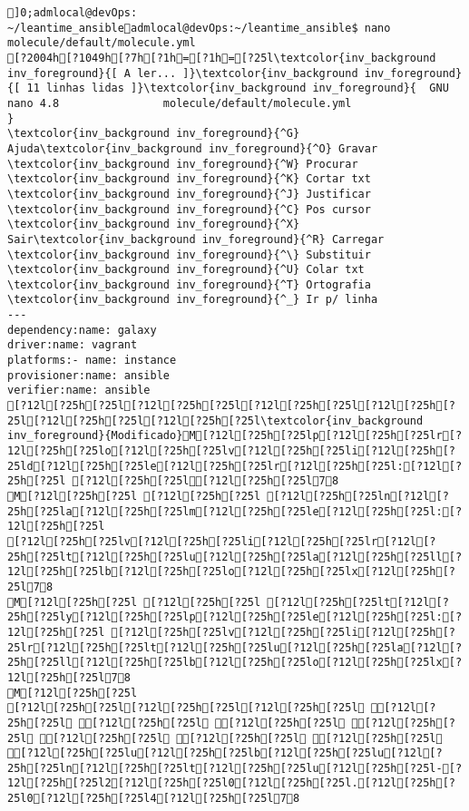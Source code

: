 \documentclass{scrartcl}
\title{}
\begin{document}
\begin{Verbatim}
]0;admlocal@devOps: ~/leantime_ansibleadmlocal@devOps:~/leantime_ansible$ nano molecule/default/molecule.yml 
[?2004h[?1049h[?7h[?1h=[?1h=[?25l\textcolor{inv_background inv_foreground}{[ A ler... ]}\textcolor{inv_background inv_foreground}{[ 11 linhas lidas ]}\textcolor{inv_background inv_foreground}{  GNU nano 4.8                molecule/default/molecule.yml                            }
\textcolor{inv_background inv_foreground}{^G} Ajuda\textcolor{inv_background inv_foreground}{^O} Gravar     \textcolor{inv_background inv_foreground}{^W} Procurar   \textcolor{inv_background inv_foreground}{^K} Cortar txt \textcolor{inv_background inv_foreground}{^J} Justificar \textcolor{inv_background inv_foreground}{^C} Pos cursor
\textcolor{inv_background inv_foreground}{^X} Sair\textcolor{inv_background inv_foreground}{^R} Carregar   \textcolor{inv_background inv_foreground}{^\} Substituir \textcolor{inv_background inv_foreground}{^U} Colar txt  \textcolor{inv_background inv_foreground}{^T} Ortografia \textcolor{inv_background inv_foreground}{^_} Ir p/ linha
---
dependency:name: galaxy
driver:name: vagrant
platforms:- name: instance
provisioner:name: ansible
verifier:name: ansible
[?12l[?25h[?25l[?12l[?25h[?25l[?12l[?25h[?25l[?12l[?25h[?25l[?12l[?25h[?25l[?12l[?25h[?25l\textcolor{inv_background inv_foreground}{Modificado}M[?12l[?25h[?25lp[?12l[?25h[?25lr[?12l[?25h[?25lo[?12l[?25h[?25lv[?12l[?25h[?25li[?12l[?25h[?25ld[?12l[?25h[?25le[?12l[?25h[?25lr[?12l[?25h[?25l:[?12l[?25h[?25l [?12l[?25h[?25l[?12l[?25h[?25l78
M[?12l[?25h[?25l [?12l[?25h[?25l [?12l[?25h[?25ln[?12l[?25h[?25la[?12l[?25h[?25lm[?12l[?25h[?25le[?12l[?25h[?25l:[?12l[?25h[?25l
[?12l[?25h[?25lv[?12l[?25h[?25li[?12l[?25h[?25lr[?12l[?25h[?25lt[?12l[?25h[?25lu[?12l[?25h[?25la[?12l[?25h[?25ll[?12l[?25h[?25lb[?12l[?25h[?25lo[?12l[?25h[?25lx[?12l[?25h[?25l78
M[?12l[?25h[?25l [?12l[?25h[?25l [?12l[?25h[?25lt[?12l[?25h[?25ly[?12l[?25h[?25lp[?12l[?25h[?25le[?12l[?25h[?25l:[?12l[?25h[?25l [?12l[?25h[?25lv[?12l[?25h[?25li[?12l[?25h[?25lr[?12l[?25h[?25lt[?12l[?25h[?25lu[?12l[?25h[?25la[?12l[?25h[?25ll[?12l[?25h[?25lb[?12l[?25h[?25lo[?12l[?25h[?25lx[?12l[?25h[?25l78
M[?12l[?25h[?25l
[?12l[?25h[?25l[?12l[?25h[?25l[?12l[?25h[?25l [?12l[?25h[?25l [?12l[?25h[?25l [?12l[?25h[?25l [?12l[?25h[?25l [?12l[?25h[?25l [?12l[?25h[?25l [?12l[?25h[?25l [?12l[?25h[?25lu[?12l[?25h[?25lb[?12l[?25h[?25lu[?12l[?25h[?25ln[?12l[?25h[?25lt[?12l[?25h[?25lu[?12l[?25h[?25l-[?12l[?25h[?25l2[?12l[?25h[?25l0[?12l[?25h[?25l.[?12l[?25h[?25l0[?12l[?25h[?25l4[?12l[?25h[?25l78

\end{Verbatim}
\end{document}
